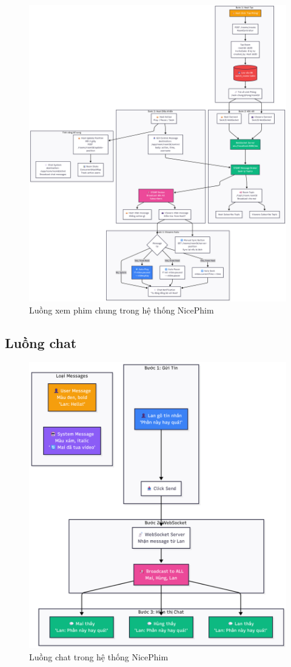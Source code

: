 \begin{figure}[H]
	\centering
	\includegraphics[width=1\textwidth]{image/mermaid/luongwatchtogether.png}
	\caption{Luồng xem phim chung trong hệ thống NicePhim}
	\label{fig:luongwatchtogether}
\end{figure}

\subsection{Luồng chat}

\begin{figure}[H]
	\centering
	\includegraphics[width=1\textwidth]{image/mermaid/chat.png}
	\caption{Luồng chat trong hệ thống NicePhim}
	\label{fig:chat}
\end{figure}
